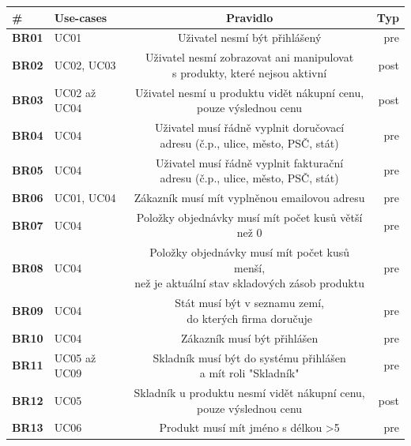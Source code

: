 \begin{table}
    \centering
    \begin{tabular}{ l l c r }
        \hline
        \textbf{\#} & \textbf{Use-cases} & \textbf{Pravidlo} & \textbf{Typ} \\ \hline \hline
        \textbf{BR01} & UC01 & Uživatel nesmí být přihlášený & pre \\ \hline
        \textbf{BR02} & UC02, UC03 & \makecell[c]{Uživatel nesmí zobrazovat ani manipulovat \\ s produkty, které nejsou aktivní} & post \\ \hline
        \textbf{BR03} & UC02 až UC04 & \makecell[c]{Uživatel nesmí u produktu vidět nákupní cenu, \\ pouze výslednou cenu} & post \\ \hline
        \textbf{BR04} & UC04 & \makecell[c]{Uživatel musí řádně vyplnit doručovací \\ adresu (č.p., ulice, město, PSČ, stát)} & pre \\ \hline
        \textbf{BR05} & UC04 & \makecell[c]{Uživatel musí řádně vyplnit fakturační \\ adresu (č.p., ulice, město, PSČ, stát)} & pre \\ \hline
        \textbf{BR06} & UC01, UC04 & Zákazník musí mít vyplněnou emailovou adresu & pre \\ \hline
        \textbf{BR07} & UC04 & Položky objednávky musí mít počet kusů větší než 0 & pre \\ \hline
        \textbf{BR08} & UC04 & \makecell[c]{Položky objednávky musí mít počet kusů menší, \\ než je aktuální stav skladových zásob produktu} & pre \\ \hline
        \textbf{BR09} & UC04 & \makecell[c]{Stát musí být v seznamu zemí, \\ do kterých firma doručuje} & pre \\ \hline
        \textbf{BR10} & UC04 & Zákazník musí být přihlášen & pre \\ \hline
        \textbf{BR11} & UC05 až UC09 & \makecell[c]{Skladník musí být do systému přihlášen \\ a mít roli "Skladník"} & pre \\ \hline
        \textbf{BR12} & UC05 & \makecell[c]{Skladník u produktu nesmí vidět nákupní cenu, \\ pouze výslednou cenu} & post \\ \hline
        \textbf{BR13} & UC06 & Produkt musí mít jméno s délkou >5 & pre \\ \hline

\end{tabular}
\end{table}

